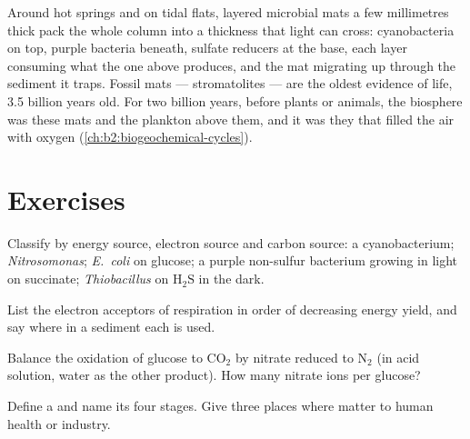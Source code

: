 \begin{remark}\label{rem:b2:microbial-metabolism:mats}
Around hot springs and on tidal flats, layered microbial mats a few
millimetres thick pack the whole column into a thickness that light
can cross: cyanobacteria on top, purple bacteria beneath, sulfate
reducers at the base, each layer consuming what the one above
produces, and the mat migrating up through the sediment it traps.
Fossil mats --- stromatolites --- are the oldest evidence of life,
\num{3.5} billion years old. For two billion years, before plants or
animals, the biosphere was these mats and the plankton above them,
and it was they that filled the air with oxygen
(\cref{ch:b2:biogeochemical-cycles}).
\end{remark}

\section{Exercises}

\begin{exercise}[$\star$]\label{exo:b2:microbial-metabolism:1}
Classify by energy source, electron source and carbon source: a
cyanobacterium; \emph{Nitrosomonas}; \emph{E.~coli} on glucose; a
purple non-sulfur bacterium growing in light on succinate;
\emph{Thiobacillus} on $\mathrm{H_2S}$ in the dark.
\end{exercise}

\begin{exercise}[$\star$]\label{exo:b2:microbial-metabolism:2}
List the electron acceptors of respiration in order of decreasing
energy yield, and say where in a sediment each is used.
\end{exercise}

\begin{exercise}[$\star$]\label{exo:b2:microbial-metabolism:3}
Balance the oxidation of glucose to $\mathrm{CO_2}$ by nitrate
reduced to $\mathrm{N_2}$ (in acid solution, water as the other
product). How many nitrate ions per glucose?
\end{exercise}

\begin{exercise}[$\star$]\label{exo:b2:microbial-metabolism:4}
Define a  and name its four stages. Give three places where
 matter to human health or industry.
\end{exercise}

